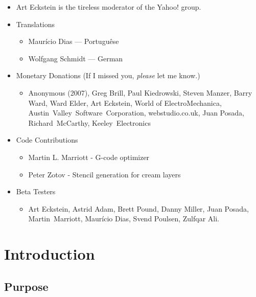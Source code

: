 \documentclass[11pt]{book}
\begin{document}
\begin{itemize}
	\item Art Eckstein is the tireless moderator of the Yahoo! group.
	\item Translations
	\begin{itemize}
		\item Maur\'icio Dias --- Portugu\^ese
		\item Wolfgang Schmidt --- German
	\end{itemize}
	\item{Monetary Donations (If I missed you, \emph{please} let me know.) }
	\begin{itemize}
    	\raggedright
		\item Anonymous (2007), Greg Brill, Paul Kiedrowski, Steven Manzer, Barry Ward, Ward Elder, Art Eckstein, World of ElectroMechanica, Austin~Valley~Software~Corporation, webstudio.co.uk, Juan Posada, Richard~McCarthy, Keeley~Electronics
	\end{itemize}
	\item{Code Contributions}
	    \begin{itemize}
	    \small
	    \item Martin L. Marriott - G-code optimizer
	    \item Peter Zotov - Stencil generation for cream layers
	    \end{itemize}
	\item{Beta Testers}
	\begin{itemize}
    	\raggedright
	    \item Art Eckstein, Astrid Adam, Brett Pound, Danny Miller, Juan Posada, Martin~Marriott, Maur\'icio Dias, Svend Poulsen, Zulfqar Ali.
	\end{itemize}
\end{itemize}


\tableofcontents

\listoffigures

\listoftables

\mainmatter

%
\chapter{Introduction}\label{chp:Introduction}
%

%
%
\section{Purpose}\label{sec:Purpose}
\end{document}
